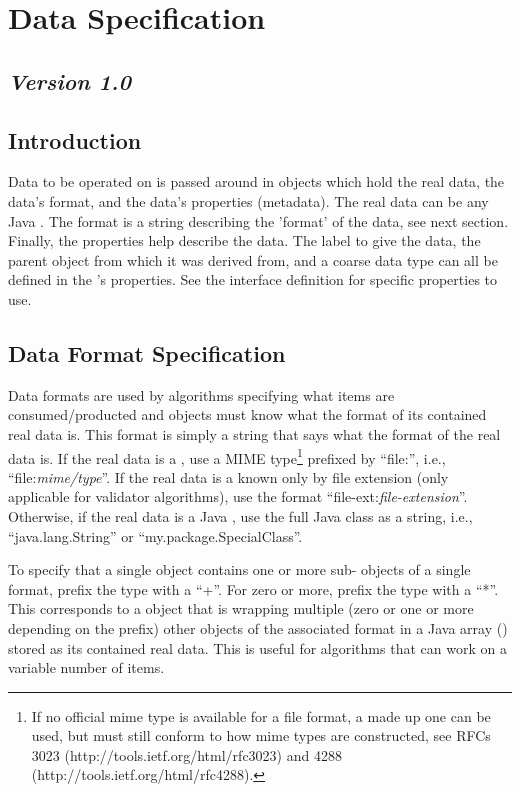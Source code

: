 \section{Data Specification}
\label{dataSpec}
\subsection*{\textit{Version 1.0}}
\subsection{Introduction}

Data to be operated on is passed around in  objects which hold the
real data, the data's format, and the data's properties (metadata). The real
data can be any Java . The format is a string describing the 'format' of the
data, see next section. Finally, the properties help describe the data. The label
to give the data, the parent  object from which it was derived from,
and a coarse data type can all be defined in the 's properties. See
the  interface definition for specific properties to use.

\subsection{Data Format Specification}

Data formats are used by algorithms specifying what  items are
consumed/producted and  objects must know what the format of its
contained real data is. This format is simply a string that says what the
format of the real data is. If the real data is a , use a
MIME type\footnote{If no official mime type is available for a file format, a
made up one can be used, but must still conform to how mime types are
constructed, see RFCs 3023 (http://tools.ietf.org/html/rfc3023) and 4288
(http://tools.ietf.org/html/rfc4288).} prefixed by ``file:'', i.e.,
``file:\textit{mime/type}''. If the real data is a  known
only by file extension (only applicable for validator algorithms), use the format
``file-ext:\textit{file-extension}''. Otherwise, if the real data is a Java
, use the full Java class as a string, i.e., ``java.lang.String''
or ``my.package.SpecialClass''.

To specify that a single  object contains one or more
sub- objects of a single format, prefix the type with a ``+''. For
zero or more, prefix the type with a ``*''. This corresponds to a 
object that is wrapping multiple (zero or one or more depending on the prefix)
other  objects of the associated format in a Java array
() stored as its contained real data. This is useful for
algorithms that can work on a variable number of  items.
